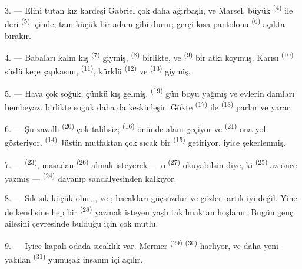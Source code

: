 3. --- Elini tutan kız kardeşi Gabriel çok daha ağırbaşlı, ve Marsel, büyük
 \textsuperscript{(4)} ile deri 
\textsuperscript{(5)} içinde, tam küçük bir adam gibi durur; gerçi kısa
pantolonu  \textsuperscript{(6)} açıkta bırakır.

4. --- Babaları kalın kış  \textsuperscript{(7)} giymiş,
 \textsuperscript{(8)} birlikte, ve 
\textsuperscript{(9)} bir atkı koymuş. Karısı 
\textsuperscript{(10)} süslü keçe şapkasını, 
\textsuperscript{(11)}, kürklü  \textsuperscript{(12)} ve
 \textsuperscript{(13)} giymiş.

5. --- Hava çok soğuk, çünkü kış gelmiş. 
\textsuperscript{(19)} gün boyu yağmış ve evlerin damları bembeyaz.
 birlikte soğuk daha da keskinleşir. Gökte 
\textsuperscript{(17)} ile  \textsuperscript{(18)} parlar ve
 yarar.

\VUsaut{4.2mm}
\VUsaut{3.0mm}

6. --- Şu zavallı  \textsuperscript{(20)} çok talihsiz;
 \textsuperscript{(16)} önünde alanı geçiyor ve
 \textsuperscript{(21)} ona yol gösteriyor. 
\textsuperscript{(14)} Jüstin mutfaktan çok sıcak bir 
\textsuperscript{(15)}  getiriyor, iyice şekerlenmiş.

7. ---  \textsuperscript{(23)}, masadan
 \textsuperscript{(26)} almak isteyerek --- o
 \textsuperscript{(27)} okuyabilsin diye, ki
 \textsuperscript{(25)} az önce yazmış ---
 \textsuperscript{(24)} dayanıp sandalyesinden kalkıyor.

8. --- Sık sık küçük  olur, ,
 ve ; bacakları güçsüzdür ve gözleri artık
iyi değil. Yine de kendisine hep bir  \textsuperscript{(28)}
yazmak isteyen yaşlı  takılmaktan hoşlanır. Bugün genç
ailesini çevresinde bulduğu için çok mutlu.

9. --- İyice kapalı odada sıcaklık var. Mermer 
\textsuperscript{(29)}  \textsuperscript{(30)} harlıyor,
ve daha yeni yakılan  \textsuperscript{(31)} yumuşak
 insanın içi açılır.

